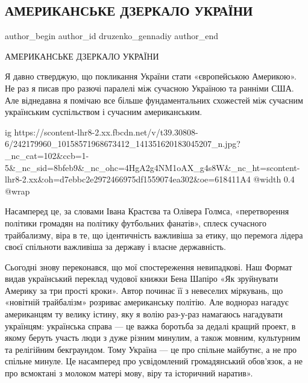  
 
 
 
 
 
\subsection{АМЕРИКАНСЬКЕ ДЗЕРКАЛО УКРАЇНИ}
\label{sec:23_10_2021.fb.druzenko_gennadiy.1.zerkalo_ukraina_amerika}
 
\ifcmt
 author_begin
   author_id druzenko_gennadiy
 author_end
\fi

АМЕРИКАНСЬКЕ ДЗЕРКАЛО УКРАЇНИ

Я давно стверджую, що покликання України стати «європейською Америкою». Не раз
я писав про разючі паралелі між сучасною Україною та ранніми США. Але
віднедавна я помічаю все більше фундаментальних схожестей між сучасним
українським суспільством і сучасним американським. 

\ifcmt
  ig https://scontent-lhr8-2.xx.fbcdn.net/v/t39.30808-6/242179960_10158571968673412_141351620183045207_n.jpg?_nc_cat=102&ccb=1-5&_nc_sid=8bfeb9&_nc_ohc=4HgA2g4NM1oAX_g4s8W&_nc_ht=scontent-lhr8-2.xx&oh=d7ebbc2e2972466975df1559074ea302&oe=618411A4
  @width 0.4
  @wrap 
\fi

Насамперед це, за словами Івана Крастєва та Олівера Голмса, «перетворення
політики громадян на політику футбольних фанатів», сплеск сучасного
трайбализму, віра в те, що ідентичність важливіша за етику, що перемога лідера
своєї спільноти важливіша за державу і власне державність.

Сьогодні знову переконався, що мої спостереження невипадкові. Наш Формат видав
український переклад чудової книжки Бена Шапіро «Як зруйнувати Америку за три
прості кроки». Автор починає її з невеселих міркувань, що «новітній трайбалізм»
розриває американську політію. Але воднораз нагадує американцям ту велику
істину, яку я волію раз-у-раз намагаюсь нагадувати українцям: українська справа
— це важка боротьба за дедалі кращий проект, в якому беруть участь люди з дуже
різним минулим, а також мовним, культурним та релігійним бекграундом. Тому
Україна — це про спільне майбутнє, а не про спільне минуле. Це насамперед про
усвідомлений громадянський обов’язок, а не про всмоктані з молоком матері мову,
віру та історичний наратив». 

